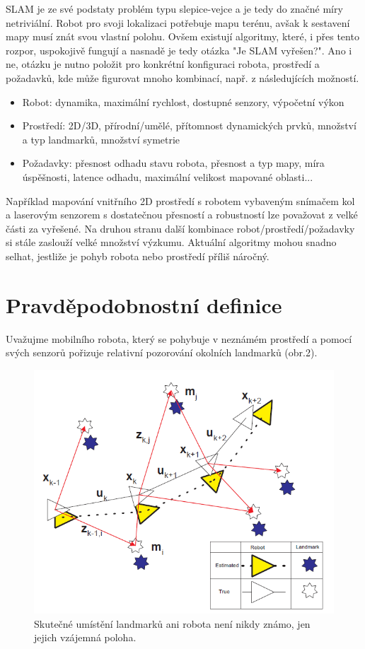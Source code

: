 \documentclass[12pt,a4paper]{article}
\begin{document}
\newpage
SLAM je ze své podstaty problém typu slepice-vejce a je tedy do značné míry netriviální. Robot pro svoji lokalizaci potřebuje mapu terénu, avšak k sestavení mapy musí znát svou vlastní polohu. Ovšem existují algoritmy, které, i přes tento rozpor, uspokojivě fungují a nasnadě je tedy otázka "Je SLAM vyřešen?". Ano i ne, otázku je nutno položit pro konkrétní konfiguraci robota, prostředí a požadavků, kde může figurovat mnoho kombinací, např. z následujících možností.
\begin{itemize}
\item Robot: dynamika, maximální rychlost, dostupné senzory, výpočetní výkon
\item Prostředí: 2D/3D, přírodní/umělé, přítomnost dynamických prvků, množství a typ landmarků, množství symetrie
\item Požadavky: přesnost odhadu stavu robota, přesnost a typ mapy, míra úspěšnosti, latence odhadu, maximální velikost mapované oblasti...
\end{itemize}
Například mapování vnitřního 2D prostředí s robotem vybaveným snímačem kol a laserovým senzorem s dostatečnou přesností a robustností lze považovat z velké části za vyřešené. Na druhou stranu další kombinace robot/prostředí/požadavky si stále zaslouží velké množství výzkumu. Aktuální algoritmy mohou snadno selhat, jestliže je pohyb robota nebo prostředí příliš náročný.


\section{Pravděpodobnostní definice}
Uvažujme mobilního robota, který se pohybuje v neznámém prostředí a pomocí svých senzorů pořizuje relativní pozorování okolních landmarků (obr.2).

\begin{figure}[H]
\centering
\includegraphics[scale=0.6]{Obr2}
\caption{Skutečné umístění landmarků ani robota není nikdy známo, jen jejich vzájemná poloha.}
\end{figure}
\end{document}
